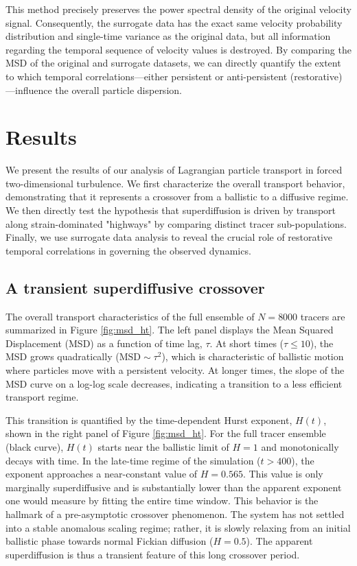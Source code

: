 \documentclass[]{article}
\begin{document}
This method precisely preserves the power spectral density of the original velocity signal. Consequently, the surrogate data has the exact same velocity probability distribution and single-time variance as the original data, but all information regarding the temporal sequence of velocity values is destroyed. By comparing the MSD of the original and surrogate datasets, we can directly quantify the extent to which temporal correlations—either persistent or anti-persistent (restorative)—influence the overall particle dispersion.

\section{Results}
\label{sec:results}
We present the results of our analysis of Lagrangian particle transport in forced two-dimensional turbulence. We first characterize the overall transport behavior, demonstrating that it represents a crossover from a ballistic to a diffusive regime. We then directly test the hypothesis that superdiffusion is driven by transport along strain-dominated "highways" by comparing distinct tracer sub-populations. Finally, we use surrogate data analysis to reveal the crucial role of restorative temporal correlations in governing the observed dynamics.

\subsection{A transient superdiffusive crossover}

The overall transport characteristics of the full ensemble of $N=8000$ tracers are summarized in Figure \ref{fig:msd_ht}. The left panel displays the Mean Squared Displacement (MSD) as a function of time lag, $\tau$. At short times ($\tau \leq 10$), the MSD grows quadratically ($\mathrm{MSD} \sim \tau^2$), which is characteristic of ballistic motion where particles move with a persistent velocity. At longer times, the slope of the MSD curve on a log-log scale decreases, indicating a transition to a less efficient transport regime.

This transition is quantified by the time-dependent Hurst exponent, $H(t)$, shown in the right panel of Figure \ref{fig:msd_ht}. For the full tracer ensemble (black curve), $H(t)$ starts near the ballistic limit of $H=1$ and monotonically decays with time. In the late-time regime of the simulation ($t > 400$), the exponent approaches a near-constant value of $H = 0.565$. This value is only marginally superdiffusive and is substantially lower than the apparent exponent one would measure by fitting the entire time window. This behavior is the hallmark of a pre-asymptotic crossover phenomenon. The system has not settled into a stable anomalous scaling regime; rather, it is slowly relaxing from an initial ballistic phase towards normal Fickian diffusion ($H=0.5$). The apparent superdiffusion is thus a transient feature of this long crossover period.
\end{document}
